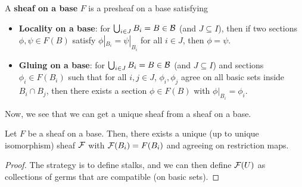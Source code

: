 \documentclass[12pt]{article}
\begin{document}
\begin{defn}
    A \textbf{sheaf on a base} $F$ is a presheaf on a base satisfying
    \begin{itemize}
        \item \textbf{Locality on a base}: for $\bigcup_{i\in J} B_i = B\in \mathcal{B}$ (and $J\subseteq I$), then if two sections $\phi,\psi \in F(B)$ satisfy $\phi|_{B_i} = \psi|_{B_i}$ for all $i\in J$, then $\phi=\psi$.
        
        \item \textbf{Gluing on a base}: for $\bigcup_{i\in J} B_i = B\in \mathcal{B}$ (and $J\subseteq I$) and sections $\phi_i \in F(B_i)$ such that for all $i,j\in J$, $\phi_i,\phi_j$ agree on all basic sets inside $B_i\cap B_j$, then there exists a section $\phi\in F(B)$ with $\phi|_{B_i} = \phi_i$.
    \end{itemize}
\end{defn}

Now, we see that we can get a unique sheaf from a sheaf on a base.

\begin{prop}
    Let $F$ be a sheaf on a base. Then, there exists a unique (up to unique isomorphism) sheaf $\mathcal{F}$ with $\mathcal{F}(B_i) = F(B_i)$ and agreeing on restriction maps.
\end{prop}

\begin{proof}
    The strategy is to define stalks, and we can then define $\mathcal{F}(U)$ as collections of germs that are compatible (on basic sets).
\end{proof}
\end{document}
